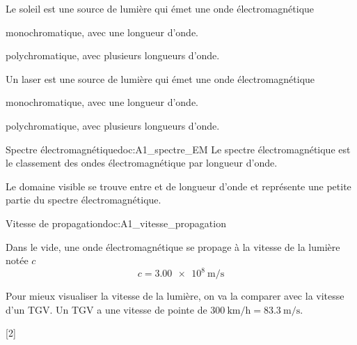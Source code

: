 \begin{qcm}{
  Le soleil est une source de lumière qui émet une onde électromagnétique
}
  \item monochromatique, avec une longueur d'onde.
  \item \reponseQCM polychromatique, avec plusieurs longueurs d'onde.
\end{qcm}

\begin{qcm}{
  Un laser est une source de lumière qui émet une onde électromagnétique
}
  \item \reponseQCM monochromatique, avec une longueur d'onde.
  \item polychromatique, avec plusieurs longueurs d'onde.
\end{qcm}


\begin{doc}{Spectre électromagnétique}{doc:A1_spectre_EM}
  Le spectre électromagnétique est le classement des ondes électromagnétique par longueur d'onde. 
  \begin{center}
  \end{center}
  Le domaine visible se trouve entre  et  de longueur d'onde et représente une petite partie du spectre électromagnétique.
\end{doc}



\begin{doc}{Vitesse de propagation}{doc:A1_vitesse_propagation}
  \begin{importants}
    Dans le vide, une onde électromagnétique se propage à la vitesse de la lumière notée $c$
    \begin{equation*}
      c = \qty{3,00e8}{\m\per\s}
    \end{equation*}
  \end{importants}
\end{doc}

Pour mieux visualiser la vitesse de la lumière, on va la comparer avec la vitesse d'un TGV.
Un TGV a une vitesse de pointe de $\qty{300}{\km\per\hour} = \qty{83,3}{\m\per\s}$.
  
[2]

